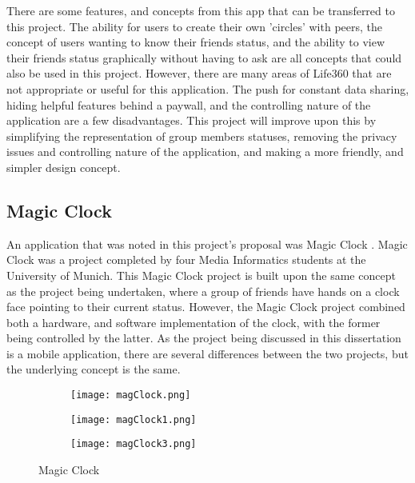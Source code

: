 There are some features, and concepts from this app that can be transferred to this project. The ability for users to create their own 'circles' with peers, the concept of users wanting to know their friends status, and the ability to view their friends status graphically without having to ask are all concepts that could also be used in this project. However, there are many areas of Life360 that are not appropriate or useful for this application. The push for constant data sharing, hiding helpful features behind a paywall, and the controlling nature of the application are a few disadvantages. This project will improve upon this by simplifying the representation of group members statuses, removing the privacy issues and controlling nature of the application, and making a more friendly, and simpler design concept. 

\subsection{Magic Clock}

An application that was noted in this project's proposal was Magic Clock \cite{magicClock}. Magic Clock was a project completed by four Media Informatics students at the University of Munich. This Magic Clock project is built upon the same concept as the project being undertaken, where a group of friends have hands on a clock face pointing to their current status. However, the Magic Clock project combined both a hardware, and software implementation of the clock, with the former being controlled by the latter. As the project being discussed in this dissertation is a mobile application, there are several differences between the two projects, but the underlying concept is the same. 

\begin{figure}[!htbp]
    \centering
    \begin{subfigure}[b]{0.22\textwidth}
        \texttt{[image: magClock.png]}
    \end{subfigure}
    \hspace{1.5em}
    \begin{subfigure}[b]{0.22\textwidth}
        \texttt{[image: magClock1.png]}
    \end{subfigure}
    \hspace{1.5em}
    \begin{subfigure}[b]{0.22\textwidth}
        \texttt{[image: magClock3.png]}
    \end{subfigure}
    \caption{Magic Clock}
    \label{fig:magClock}
\end{figure}
\FloatBarrier

